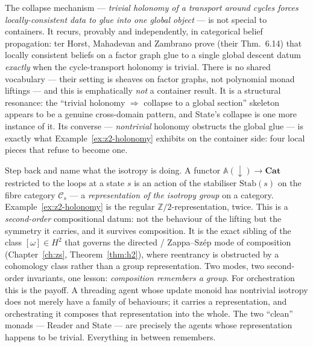 \documentclass[11pt,a4paper]{book}
\newcommand{\Cat}{\mathbf{Cat}}
\theoremstyle{plain}
\theoremstyle{definition}
\theoremstyle{remark}
\begin{document}
\begin{teachbox}
The collapse mechanism --- \emph{trivial holonomy of a transport around cycles forces locally-consistent
data to glue into one global object} --- is not special to containers. It recurs, provably and
independently, in categorical belief propagation: ter Horst, Mahadevan and Zambrano \cite{CBP} prove
(their Thm.~6.14) that locally consistent beliefs on a factor graph glue to a single global descent datum
\emph{exactly} when the cycle-transport holonomy is trivial. There is no shared vocabulary --- their
setting is sheaves on factor graphs, not polynomial monad liftings --- and this is emphatically \emph{not}
a container result. It is a structural resonance: the ``trivial holonomy $\Rightarrow$ collapse to a global
section'' skeleton appears to be a genuine cross-domain pattern, and State's collapse is one more instance
of it. Its converse --- \emph{nontrivial} holonomy obstructs the global glue --- is exactly what
Example~\ref{ex:z2-holonomy} exhibits on the container side: four local pieces that refuse to become one.
\end{teachbox}

\begin{teachbox}
Step back and name what the isotropy is doing. A functor $\mathbb A(\downarrow)\to\Cat$ restricted to the
loops at a state $s$ is an action of the stabiliser $\mathrm{Stab}(s)$ on the fibre category
$\mathcal C_{s}$ --- a \emph{representation of the isotropy group} on a category. Example~\ref{ex:z2-holonomy}
is the regular $\mathbb Z/2$-representation, twice. This is a \emph{second-order} compositional datum:
not the behaviour of the lifting but the symmetry it carries, and it survives composition. It is the exact
sibling of the class $[\omega]\in H^{2}$ that governs the directed / Zappa--Szép mode of composition
(Chapter~\ref{ch:zs}, Theorem~\ref{thm:h2}), where reentrancy is obstructed by a cohomology class rather
than a group representation. Two modes, two second-order invariants, one lesson: \emph{composition remembers a group}.
For orchestration this is the payoff. A threading agent whose update monoid has nontrivial isotropy does
not merely have a family of behaviours; it carries a representation, and orchestrating it composes that
representation into the whole. The two ``clean'' monads --- Reader and State --- are precisely the agents
whose representation happens to be trivial. Everything in between remembers.
\end{teachbox}
\end{document}
